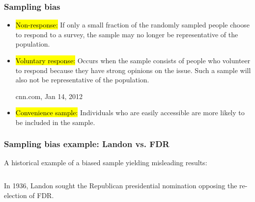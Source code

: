 \documentclass[slidestop,compress,mathserif]{beamer}
\begin{document}
\begin{frame}
	\frametitle{Sampling bias}

	\begin{itemize}
		\item \hl{Non-response:} If only a small fraction of the randomly sampled people choose to respond to a survey, the sample may no longer be representative of the population.
		\pause
		\item \hl{Voluntary response:} Occurs when the sample consists of people who volunteer to respond because they have strong opinions on the issue. Such a sample will also not be representative of the population.
		\pause
		\begin{center}
		{\tiny cnn.com, Jan 14, 2012}
		\end{center}
		\pause
		\item \hl{Convenience sample:} Individuals who are easily accessible are more likely to be included in the sample.

	\end{itemize}

\end{frame}


\begin{frame}
	\frametitle{Sampling bias example: Landon vs. FDR}

	A historical example of a biased sample yielding misleading results: \\

	$\:$ \\

	\begin{columns}[c]
		In 1936, Landon sought the Republican presidential nomination opposing the re-election of FDR.
	\end{columns}

\end{frame}
\end{document}
